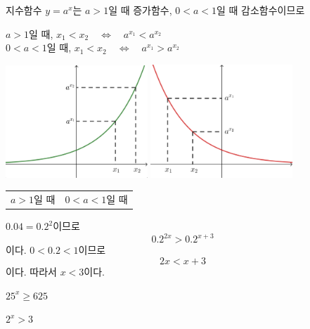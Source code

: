 \documentclass{oblivoir}
\begin{document}
지수함수 \(y=a^x\)는 \(a>1\)일 때 증가함수, \(0<a<1\)일 때 감소함수이므로
\begin{mdframed}[leftmargin=.1\textwidth,rightmargin=.1\textwidth]\centering
\(a>1\)일 때,		\quad \(x_1<x_2\quad\Longleftrightarrow\quad a^{x_1}<a^{x_2}\)\\
\(0<a<1\)일 때,	\quad \(x_1<x_2\quad\Longleftrightarrow\quad a^{x_1}>a^{x_2}\)
\end{mdframed}

\begin{center}
\includegraphics[width=0.4\textwidth]{inequality_1}
\qquad\quad
\includegraphics[width=0.4\textwidth]{inequality_2}
\begin{tabu}{X[c]X[c]}
\(a>1\)일 때
&
\(0<a<1\)일 때
\end{tabu}
\end{center}

%
\label{ineq1}
\begin{mdframed}
\(0.04=0.2^2\)이므로
\[0.2^{2x}>0.2^{x+3}\]
이다.
\(0<0.2<1\)이므로
\[2x<x+3\]
이다.
따라서 \(x<3\)이다.
\end{mdframed}

%
\label{ineq2}
\begin{enumerate*}[itemjoin=\tabto{.5\textwidth}]
\item
\(25^x\ge625\)
\item
\(2^x>3\)
\end{enumerate*}
\end{document}
